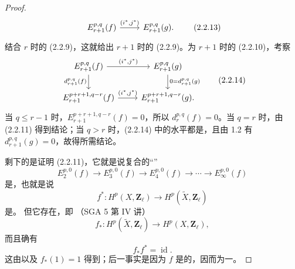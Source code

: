 \begin{proof}
\[\begin{tikzcd}
E_{r+1}^{p,q}(f)\arrow[r,"{(i^*,j^*)}"]&E_{r+1}^{p,q}(g).
\end{tikzcd}\tag{2.2.13}
\]
结合 $r$ 时的 (2.2.9)，这就给出 $r+1$ 时的 (2.2.9)。为 $r+1$ 时的 (2.2.10)，考察
\[
\begin{tikzcd}
E_{r+1}^{p,q}(f)\arrow[r,"{(i^*,j^*)}"]\arrow[d,"{d_{r+1}^{p,q}(f)}"']&E_{r+1}^{p,q}(g)\arrow[d,"{0=d_{r+1}^{p,q}(g)}"]\\
E_{r+1}^{p+r+1,q-r}(f)\arrow[r,"{(i^*,j^*)}"]&E_{r+1}^{p+r+1,q-r}(g).
\end{tikzcd}\tag{2.2.14}
\]
当 $q\leq r-1$ 时，$E_{r+1}^{p+r+1,q-r}(f)=0$，所以 $d_r^{p,q}(f)=0$。当 $q=r$ 时，由 (2.2.11) 得到结论；当 $q>r$ 时，(2.2.14) 中的水平都是，且由 1.2 有 $d_{r+1}^{p,q}(g)=0$，故得所需结论。

剩下的是证明 (2.2.11)，它就是说复合的“”
\[
 E_2^{p,0}(f)\longrightarrow E_3^{p,0}(f)\longrightarrow E_4^{p,0}(f)\longrightarrow\cdots\longrightarrow E_\infty^{p,0}(f)\tag{2.2.15}
\]
是，也就是说
\[
 f^*:H^p(X,\mathbf Z_\ell)\longrightarrow H^p(\widetilde X,\mathbf Z_\ell)\tag{2.2.16}
\]
是。
但它存在，即 （SGA 5 第 IV 讲）
\[
 f_*:H^p(\widetilde X,\mathbf Z_\ell)\longrightarrow H^p(X,\mathbf Z_\ell),\tag{2.2.17}
\]
而且确有
\[
 f_*f^*=\operatorname{id}.\tag{2.2.18}
\]
这由以及 $f_*(1)=1$ 得到；后一事实是因为 $f$ 是的，因而为一。


\end{proof}
